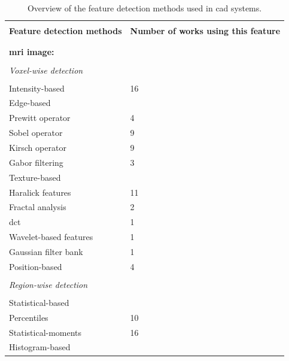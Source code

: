 \documentclass[a4paper,num-refs]{wiley-article}
\begin{document}
\begin{table}
  \centering
  \caption{Overview of the feature detection methods used in \ac{cad} systems.}\label{tab:feat}
  \footnotesize
  \begin{threeparttable}
    \renewcommand{\arraystretch}{.7}
    \begin{tabular}{p{.5\linewidth} p{.4\linewidth}}
      \hline \\ [-1.5ex]
      \textbf{Feature detection methods} & \textbf{Number of works using this feature} \\ \\ [-1.5ex]
      \hline \\ [-1.5ex]
      \textbf{\ac{mri} image:} & \\ \\ [-1.5ex]
      \quad \textit{Voxel-wise detection} &  \\ \\ [-1.5ex]
      \quad \quad Intensity-based & 16 \\ %
      \quad \quad Edge-based & \\
      \quad \quad \quad Prewitt operator & 4 \\
      \quad \quad \quad Sobel operator & 9 \\
      \quad \quad \quad Kirsch operator & 9 \\
      \quad \quad \quad Gabor filtering & 3 \\
      \quad \quad Texture-based & \\
      \quad \quad \quad Haralick features & 11 \\
      \quad \quad \quad Fractal analysis & 2 \\
      \quad \quad \quad \Ac{dct} & 1 \\
      \quad \quad \quad Wavelet-based features & 1 \\
      \quad \quad \quad Gaussian filter bank & 1 \\
      \quad \quad Position-based &  4 \\ \\ [-1.5ex]
      \quad \textit{Region-wise detection} &  \\ \\ [-1.5ex]
      \quad \quad Statistical-based & \\
      \quad \quad \quad Percentiles & 10 \\
      \quad \quad \quad Statistical-moments & 16 \\
      \quad \quad Histogram-based & \\

\end{tabular}
\end{threeparttable}
\end{table}
\end{document}
